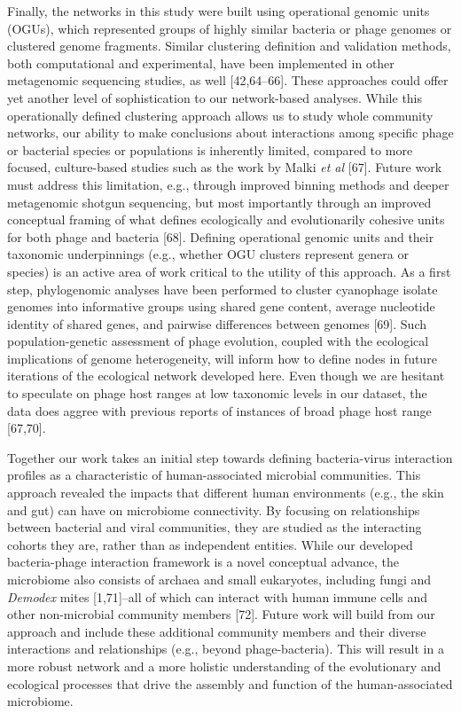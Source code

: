\documentclass[12pt,]{article}
\begin{document}
Finally, the networks in this study were built using operational genomic
units (OGUs), which represented groups of highly similar bacteria or
phage genomes or clustered genome fragments. Similar clustering
definition and validation methods, both computational and experimental,
have been implemented in other metagenomic sequencing studies, as well
{[}42,64--66{]}. These approaches could offer yet another level of
sophistication to our network-based analyses. While this operationally
defined clustering approach allows us to study whole community networks,
our ability to make conclusions about interactions among specific phage
or bacterial species or populations is inherently limited, compared to
more focused, culture-based studies such as the work by Malki \emph{et
al} {[}67{]}. Future work must address this limitation, e.g., through
improved binning methods and deeper metagenomic shotgun sequencing, but
most importantly through an improved conceptual framing of what defines
ecologically and evolutionarily cohesive units for both phage and
bacteria {[}68{]}. Defining operational genomic units and their
taxonomic underpinnings (e.g., whether OGU clusters represent genera or
species) is an active area of work critical to the utility of this
approach. As a first step, phylogenomic analyses have been performed to
cluster cyanophage isolate genomes into informative groups using shared
gene content, average nucleotide identity of shared genes, and pairwise
differences between genomes {[}69{]}. Such population-genetic assessment
of phage evolution, coupled with the ecological implications of genome
heterogeneity, will inform how to define nodes in future iterations of
the ecological network developed here. Even though we are hesitant to
speculate on phage host ranges at low taxonomic levels in our dataset,
the data does aggree with previous reports of instances of broad phage
host range {[}67,70{]}.

Together our work takes an initial step towards defining bacteria-virus
interaction profiles as a characteristic of human-associated microbial
communities. This approach revealed the impacts that different human
environments (e.g., the skin and gut) can have on microbiome
connectivity. By focusing on relationships between bacterial and viral
communities, they are studied as the interacting cohorts they are,
rather than as independent entities. While our developed bacteria-phage
interaction framework is a novel conceptual advance, the microbiome also
consists of archaea and small eukaryotes, including fungi and
\emph{Demodex} mites {[}1,71{]}--all of which can interact with human
immune cells and other non-microbial community members {[}72{]}. Future
work will build from our approach and include these additional community
members and their diverse interactions and relationships (e.g., beyond
phage-bacteria). This will result in a more robust network and a more
holistic understanding of the evolutionary and ecological processes that
drive the assembly and function of the human-associated microbiome.
\end{document}
